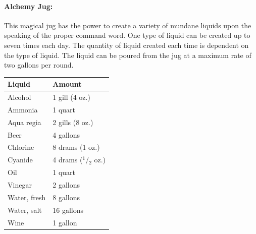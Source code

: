 \begin{multicols}{2}
\paragraph{Alchemy Jug:} This magical jug has the power to create a variety of mundane liquids upon the speaking of the proper command word.  One type of liquid can be created up to seven times each day.  The quantity of liquid created each time is dependent on the type of liquid.  The liquid can be poured from the jug at a maximum rate of two gallons per round.

\noindent \begin{tabular}{|p{}|p{}|}
\hline
Liquid	& Amount \\
\hline\hline
\rowcolor[gray]{0.9}Alcohol	& 1 gill (4 oz.) \\
Ammonia	& 1 quart \\
\rowcolor[gray]{0.9}Aqua regia	& 2 gills (8 oz.) \\
Beer	& 4 gallons \\
\rowcolor[gray]{0.9}Chlorine	& 8 drams (1 oz.) \\
Cyanide	& 4 drams ($^1$/$_2$ oz.) \\
\rowcolor[gray]{0.9}Oil	& 1 quart \\
Vinegar	& 2 gallons \\
\rowcolor[gray]{0.9}Water, fresh	& 8 gallons \\
Water, salt	& 16 gallons \\
\rowcolor[gray]{0.9}Wine	& 1 gallon \\
\hline
\end{tabular}

\end{multicols}

